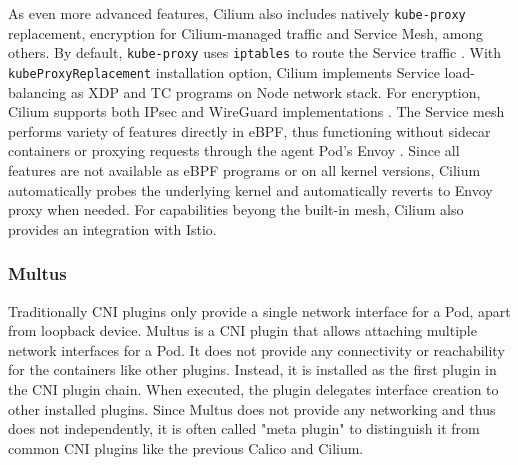 \documentclass[english, 12pt, a4paper, sci, utf8, a-2b, online]{aaltothesis}
\begin{document}
As even more advanced features, Cilium also includes natively \texttt{kube-proxy} replacement, encryption for Cilium-managed traffic and Service Mesh, among others. By default, \texttt{kube-proxy} uses \texttt{iptables} to route the Service traffic \cite{cilium-proxy-free}. With \texttt{kubeProxyReplacement} installation option, Cilium implements Service load-balancing as XDP and TC programs on Node network stack. For encryption, Cilium supports both IPsec and WireGuard implementations \cite{cilium-encryption}. The Service mesh performs variety of features directly in eBPF, thus functioning without sidecar containers or proxying requests through the agent Pod's Envoy \cite{cilium-service-mesh}. Since all features are not available as eBPF programs or on all kernel versions,  Cilium automatically probes the underlying kernel and automatically reverts to Envoy proxy when needed. For capabilities beyong the built-in mesh, Cilium also provides an integration with Istio.


\subsubsection{Multus}

Traditionally CNI plugins only provide a single network interface for a Pod, apart from loopback device. Multus \cite{multus-cni} is a CNI plugin that allows attaching multiple network interfaces for a Pod. It does not provide any connectivity or reachability for the containers like other plugins. Instead, it is installed as the first plugin in the CNI plugin chain. When executed, the plugin delegates interface creation to other installed plugins. Since Multus does not provide any networking and thus does not independently, it is often called "meta plugin" to distinguish it from common CNI plugins like the previous Calico and Cilium.
\end{document}
